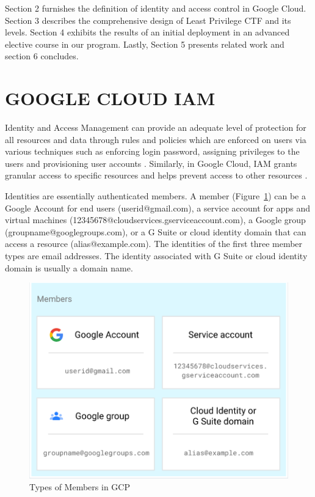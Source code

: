 \documentclass[a4paper,twoside]{article}
\begin{document}
Section 2 furnishes the definition of identity and access control in Google Cloud. Section 3 describes the comprehensive design of Least Privilege CTF and its levels. Section 4 exhibits the results of an initial deployment in an advanced elective course in our program. Lastly, Section 5 presents related work and section 6 concludes.


\section{\uppercase{Google Cloud IAM}}
\label{sec:gcpiam}

\noindent Identity and Access Management can provide an adequate level of protection for all resources and data through rules and policies which are enforced on users via various techniques such as enforcing login password, assigning privileges to the users and provisioning user accounts \cite{AlmullaSameeraAbdulrahmanandYeun2010}.
Similarly, in Google Cloud, IAM grants granular access to specific resources and helps prevent access to other resources \cite{Googlecloudiam}.

Identities are essentially authenticated members. A member (Figure~\ref{fig:mem}) can be a Google Account for end users (userid@gmail.com), a service account for apps and virtual machines (12345678@cloudservices.gserviceaccount.com), a Google group (groupname@googlegroups.com), or a G Suite or cloud identity domain that can access a resource (alias@example.com). The identities of the first three member types are email addresses. The identity associated with G Suite or cloud identity domain is usually a domain name.
\begin{figure}[h]
  \centering
  \includegraphics[width=\linewidth]{pic/mem}
  \caption {Types of Members in GCP}
  \label{fig:mem}
\end{figure}
\end{document}
